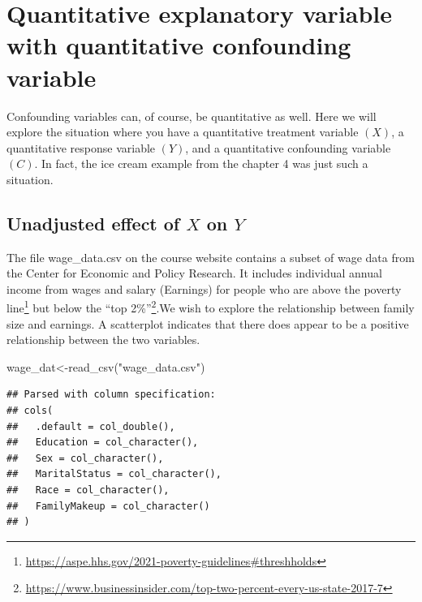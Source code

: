 \documentclass[
]{book}
\newenvironment{Shaded}{\begin{snugshade}}{\end{snugshade}}
\newcommand{\FunctionTok}[1]{\textcolor[rgb]{0.00,0.00,0.00}{#1}}
\newcommand{\NormalTok}[1]{#1}
\newcommand{\OtherTok}[1]{\textcolor[rgb]{0.56,0.35,0.01}{#1}}
\newcommand{\StringTok}[1]{\textcolor[rgb]{0.31,0.60,0.02}{#1}}
\begin{document}
\hypertarget{quantitative-explanatory-variable-with-quantitative-confounding-variable}{%
\section{Quantitative explanatory variable with quantitative confounding variable}\label{quantitative-explanatory-variable-with-quantitative-confounding-variable}}

Confounding variables can, of course, be quantitative as well. Here we will explore the situation where you have a quantitative treatment variable \((X)\), a quantitative response variable \((Y)\), and a quantitative confounding variable \((C)\). In fact, the ice cream example from the chapter 4 was just such a situation.

\hypertarget{unadjusted-effect-of-x-on-y-1}{%
\subsection{\texorpdfstring{Unadjusted effect of \(X\) on \(Y\)}{Unadjusted effect of X on Y}}\label{unadjusted-effect-of-x-on-y-1}}

The file wage\_data.csv on the course website contains a subset of wage data from the Center for Economic and Policy Research. It includes individual annual income from wages and salary (Earnings) for people who are above the poverty line\footnote{\url{https://aspe.hhs.gov/2021-poverty-guidelines\#threshholds}} but below the ``top 2\%''\footnote{\url{https://www.businessinsider.com/top-two-percent-every-us-state-2017-7}}.We wish to explore the relationship between family size and earnings. A scatterplot indicates that there does appear to be a positive relationship between the two variables.

\begin{Shaded}
\begin{Highlighting}[]
\NormalTok{wage\_dat}\OtherTok{\textless{}{-}}\FunctionTok{read\_csv}\NormalTok{(}\StringTok{"wage\_data.csv"}\NormalTok{)}
\end{Highlighting}
\end{Shaded}

\begin{verbatim}
## Parsed with column specification:
## cols(
##   .default = col_double(),
##   Education = col_character(),
##   Sex = col_character(),
##   MaritalStatus = col_character(),
##   Race = col_character(),
##   FamilyMakeup = col_character()
## )
\end{verbatim}
\end{document}
